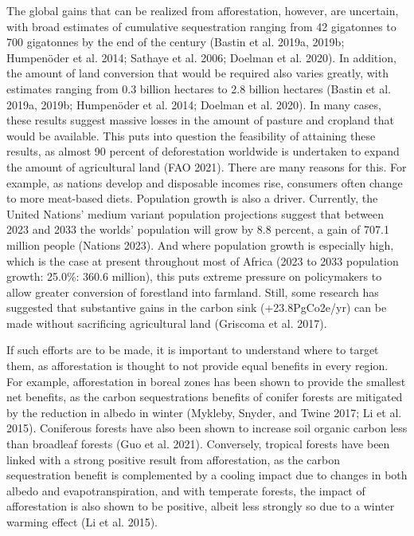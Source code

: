 \documentclass[
]{article}
\begin{document}
The global gains that can be realized from afforestation, however, are uncertain, with broad estimates of cumulative sequestration ranging from 42 gigatonnes to 700 gigatonnes by the end of the century (Bastin et al. 2019a, 2019b; Humpenöder et al. 2014; Sathaye et al. 2006; Doelman et al. 2020). In addition, the amount of land conversion that would be required also varies greatly, with estimates ranging from 0.3 billion hectares to 2.8 billion hectares (Bastin et al. 2019a, 2019b; Humpenöder et al. 2014; Doelman et al. 2020). In many cases, these results suggest massive losses in the amount of pasture and cropland that would be available. This puts into question the feasibility of attaining these results, as almost 90 percent of deforestation worldwide is undertaken to expand the amount of agricultural land (FAO 2021). There are many reasons for this. For example, as nations develop and disposable incomes rise, consumers often change to more meat-based diets. Population growth is also a driver. Currently, the United Nations' medium variant population projections suggest that between 2023 and 2033 the worlds' population will grow by 8.8 percent, a gain of 707.1 million people (Nations 2023). And where population growth is especially high, which is the case at present throughout most of Africa (2023 to 2033 population growth: 25.0\%: 360.6 million), this puts extreme pressure on policymakers to allow greater conversion of forestland into farmland. Still, some research has suggested that substantive gains in the carbon sink (+23.8PgCo2e/yr) can be made without sacrificing agricultural land (Griscoma et al. 2017).

If such efforts are to be made, it is important to understand where to target them, as afforestation is thought to not provide equal benefits in every region. For example, afforestation in boreal zones has been shown to provide the smallest net benefits, as the carbon sequestrations benefits of conifer forests are mitigated by the reduction in albedo in winter (Mykleby, Snyder, and Twine 2017; Li et al. 2015). Coniferous forests have also been shown to increase soil organic carbon less than broadleaf forests (Guo et al. 2021). Conversely, tropical forests have been linked with a strong positive result from afforestation, as the carbon sequestration benefit is complemented by a cooling impact due to changes in both albedo and evapotranspiration, and with temperate forests, the impact of afforestation is also shown to be positive, albeit less strongly so due to a winter warming effect (Li et al. 2015).
\end{document}
